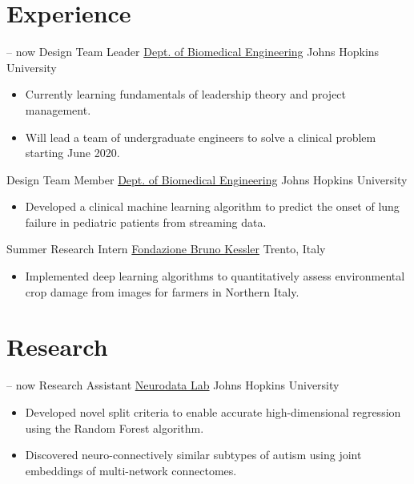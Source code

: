 \section{Experience}
\cventry
{-- now}
{Design Team Leader}
{\href{https://cbid.bme.jhu.edu/academics/undergraduate-studies/}{Dept. of Biomedical Engineering}}
{Johns Hopkins University}
{}
{
\begin{itemize}
    \item Currently learning fundamentals of leadership theory and project management.
    \item Will lead a team of undergraduate engineers to solve a clinical problem starting June 2020.
\end{itemize}{}
}

\cventry
{\dates[12.2017-05.2018]}
{Design Team Member}
{\href{https://cbid.bme.jhu.edu/academics/undergraduate-studies/}{Dept. of Biomedical Engineering}}
{Johns Hopkins University}
{}
{
\begin{itemize}
    \item Developed a clinical machine learning algorithm to predict the onset of lung failure in pediatric patients from streaming data.
\end{itemize}{}
}

\cventry
{\dates[06.2017-07.2017]}
{Summer Research Intern}
{\href{https://webvalley.fbk.eu}{Fondazione Bruno Kessler}}
{Trento, Italy}
{}
{
\begin{itemize}
    \item Implemented deep learning algorithms to quantitatively assess environmental crop damage from images for farmers in Northern Italy.
\end{itemize}{}
}


\section{Research}

\cventry
{-- now}
{Research Assistant}
{\href{https://neurodata.io}{Neurodata Lab}}
{Johns Hopkins University}
{}
{
\begin{itemize}
    \item Developed novel split criteria to enable accurate high-dimensional regression using the Random Forest algorithm.
    \item Discovered neuro-connectively similar subtypes of autism using joint embeddings of multi-network connectomes.
\end{itemize}
}

